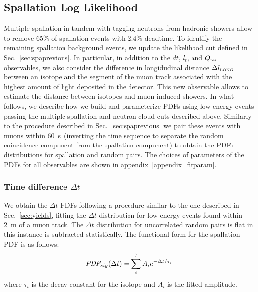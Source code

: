 \subsection{Spallation Log Likelihood}
\label{sec:spaloglike}
Multiple spallation in tandem with tagging neutrons from hadronic showers allow to remove 65\% of spallation events with 2.4\% deadtime. To identify the remaining spallation background events, we update the likelihood cut defined in Sec.~\ref{sec:spaprevious}. In particular, in addition to the $dt$, $l_t$, and $Q_{\mbox{\tiny res}}$ observables, we also consider the difference in longidudinal distance $\Delta l_{\mbox{\tiny LONG}}$ between an isotope and the segment of the muon track associated with the highest amount of light deposited in the detector. This new observable allows to estimate the distance between isotopes and muon-induced showers. In what follows, we describe how we build and parameterize PDFs using low energy events passing the multiple spallation and neutron cloud cuts described above. Similarly to the procedure described in Sec.~\ref{sec:spaprevious} we pair these events with muons within $60$~s~(inverting the time sequence to separate the random coincidence component from the spallation component) to obtain the PDFs distributions for spallation and random pairs. The choices of parameters of the PDFs for all observables are shown in appendix~\ref{appendix_fitparam}.

\subsubsection{Time difference $\Delta t$}
We obtain the $\Delta t$ PDFs following a procedure similar to the one described in Sec.~\ref{sec:yields}, fitting the $\Delta t$ distribution for low energy events found within 2~m of a muon track. The $\Delta t$ distribution for uncorrelated random pairs is flat in this instance is subtracted statistically. The functional form for the spallation PDF is as follows:
\begin{equation}
    \mbox{\it PDF}_{sig}(\Delta t) = \sum_i^7 A_i e^{-\Delta t/\tau_i}
\end{equation}
where $\tau_i$ is the decay constant for the isotope and $A_i$ is the fitted amplitude. 

